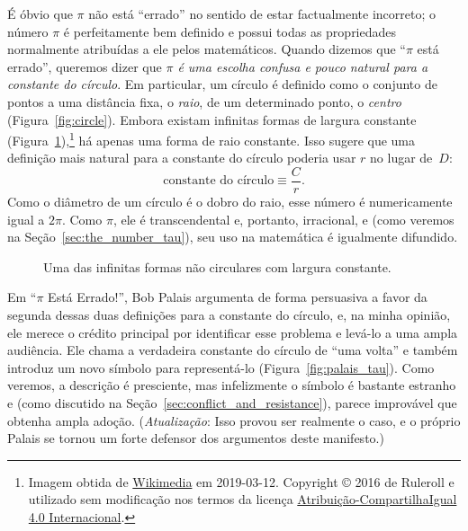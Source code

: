 É óbvio que $\pi$ não está ``errado'' no sentido de estar factualmente incorreto; o número $\pi$ é perfeitamente bem definido e possui todas as propriedades normalmente atribuídas a ele pelos matemáticos. Quando dizemos que ``$\pi$ está errado'', queremos dizer que \emph{$\pi$ é uma escolha confusa e pouco natural para a constante do círculo}. Em particular, um círculo é definido como o conjunto de pontos a uma distância fixa, o \emph{raio}, de um determinado ponto, o \emph{centro} (Figura~\ref{fig:circle}). Embora existam infinitas formas de largura constante (Figura~\ref{fig:constant_width}),\footnote{Imagem obtida de \href{https://commons.wikimedia.org/wiki/File:Reuleaux_triangle_roll.gif}{Wikimedia} em 2019-03-12. Copyright © 2016 de Ruleroll e utilizado sem modificação nos termos da licença \href{https://creativecommons.org/licenses/by-sa/4.0/deed.pt_BR}{Atribuição-CompartilhaIgual 4.0 Internacional}.} há apenas uma forma de raio constante. Isso sugere que uma definição mais natural para a constante do círculo poderia usar $r$ no lugar de~$D$:
\begin{equation}
\label{eq:circle_constant}
\mbox{constante do círculo} \equiv \frac{C}{r}.
\end{equation}
Como o diâmetro de um círculo é o dobro do raio, esse número é numericamente igual a $2\pi$. Como $\pi$, ele é transcendental e, portanto, irracional, e (como veremos na Seção~\ref{sec:the_number_tau}), seu uso na matemática é igualmente difundido.

\begin{figure}
\caption{Uma das infinitas formas não circulares com largura constante.\label{fig:constant_width}}
\end{figure}

Em ``$\pi$ Está Errado!'', Bob Palais argumenta de forma persuasiva a favor da segunda dessas duas definições para a constante do círculo, e, na minha opinião, ele merece o crédito principal por identificar esse problema e levá-lo a uma ampla audiência. Ele chama a verdadeira constante do círculo de ``uma volta'' e também introduz um novo símbolo para representá-lo (Figura~\ref{fig:palais_tau}). Como veremos, a descrição é presciente, mas infelizmente o símbolo é bastante estranho e (como discutido na Seção~\ref{sec:conflict_and_resistance}), parece improvável que obtenha ampla adoção. (\emph{Atualização}: Isso provou ser realmente o caso, e o próprio Palais se tornou um forte defensor dos argumentos deste manifesto.)

